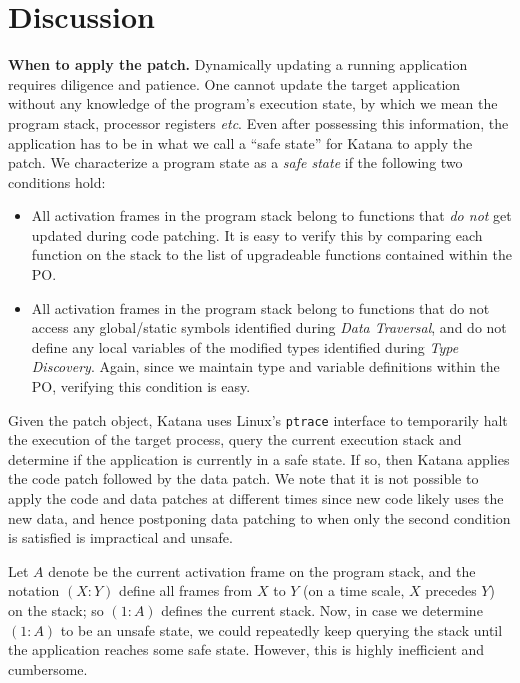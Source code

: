\section{Discussion}

{\bf When to apply the patch.}
%
Dynamically updating a running application requires diligence and
patience. One cannot update the target application without any
knowledge of the program's execution state, by which we mean the
program stack, processor registers {\it etc}.  Even after possessing
this information, the application has to be in what we call a ``safe
state'' for Katana to apply the patch. We characterize a program state
as a {\it safe state} if the following two conditions hold:
\begin{itemize}
\item All activation frames in the program stack belong to functions
  that {\it do not} get updated during code patching. It is easy to
  verify this by comparing each function on the stack to the list of
  upgradeable functions contained within the PO.

\item All activation frames in the program stack belong to functions
  that do not access any global/static symbols identified during {\it
    Data Traversal}, and do not define any local variables of the
  modified types identified during {\it Type Discovery}. Again, since
  we maintain type and variable definitions within the PO, verifying
  this condition is easy.
\end{itemize}

Given the patch object, Katana uses Linux's {\tt ptrace} interface to
temporarily halt the execution of the target process, query the
current execution stack and determine if the application is currently
in a safe state. If so, then Katana applies the code patch followed by
the data patch. We note that it is not possible to apply the code and
data patches at different times since new code likely uses the new
data, and hence postponing data patching to when only the second
condition is satisfied is impractical and unsafe.

Let $A$ denote be the current activation frame on the program stack,
and the notation $(X:Y)$ define all frames from $X$ to $Y$ (on a time
scale, $X$ precedes $Y$) on the stack; so $(1:A)$ defines the current
stack. Now, in case we determine $(1:A)$ to be an unsafe state, we
could repeatedly keep querying the stack until the application reaches
some safe state. However, this is highly inefficient and cumbersome.


